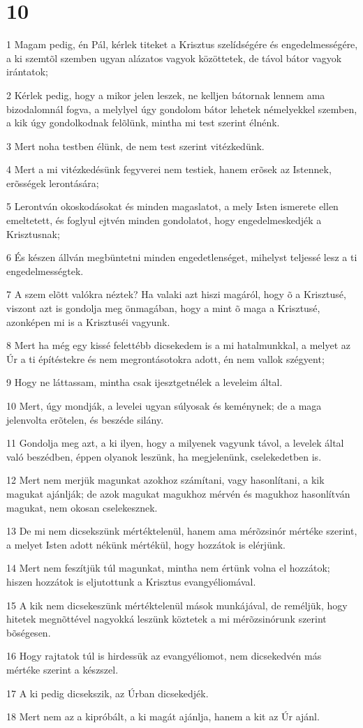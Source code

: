 \chapter{10}

\par 1 Magam pedig, én Pál, kérlek titeket a Krisztus szelídségére és engedelmességére, a ki szemtõl szemben ugyan alázatos  vagyok közöttetek, de távol bátor vagyok irántatok;
\par 2 Kérlek pedig, hogy a mikor jelen leszek, ne kelljen bátornak lennem ama bizodalomnál fogva, a melylyel úgy gondolom bátor lehetek némelyekkel szemben, a kik úgy gondolkodnak felõlünk, mintha mi test szerint élnénk.
\par 3 Mert noha testben élünk, de nem test szerint vitézkedünk.
\par 4 Mert a mi vitézkedésünk fegyverei nem testiek, hanem erõsek az Istennek, erõsségek  lerontására;
\par 5 Lerontván okoskodásokat és minden magaslatot, a mely Isten ismerete ellen emeltetett, és foglyul ejtvén minden gondolatot, hogy engedelmeskedjék a Krisztusnak;
\par 6 És készen állván megbüntetni minden engedetlenséget, mihelyst teljessé lesz a ti engedelmességtek.
\par 7 A szem elõtt valókra néztek? Ha valaki azt hiszi magáról, hogy õ a Krisztusé, viszont azt is gondolja meg önmagában, hogy a mint õ maga a Krisztusé, azonképen mi is a Krisztuséi vagyunk.
\par 8 Mert ha még egy kissé felettébb dicsekedem is a mi hatalmunkkal, a  melyet az Úr a ti építéstekre és nem megrontásotokra adott, én nem vallok szégyent;
\par 9 Hogy ne láttassam, mintha csak ijesztgetnélek a leveleim által.
\par 10 Mert, úgy mondják, a levelei ugyan súlyosak és keménynek; de a maga jelenvolta erõtelen, és beszéde silány.
\par 11 Gondolja meg azt, a ki ilyen, hogy a milyenek vagyunk távol, a levelek által való beszédben, éppen olyanok leszünk, ha megjelenünk, cselekedetben is.
\par 12 Mert nem merjük magunkat azokhoz számítani, vagy hasonlítani, a kik magukat ajánlják; de azok magukat magukhoz mérvén és magukhoz hasonlítván magukat, nem okosan cselekesznek.
\par 13 De mi nem dicsekszünk mértéktelenül, hanem ama mérõzsinór mértéke szerint, a melyet Isten adott nékünk mértékül, hogy hozzátok is elérjünk.
\par 14 Mert nem feszítjük túl magunkat, mintha nem értünk volna el hozzátok; hiszen hozzátok is eljutottunk a Krisztus evangyéliomával.
\par 15 A kik nem dicsekeszünk mértéktelenül mások munkájával, de reméljük, hogy hitetek megnõttével nagyokká leszünk köztetek a mi mérõzsinórunk szerint bõségesen.
\par 16 Hogy rajtatok túl is hirdessük az evangyéliomot, nem dicsekedvén más mértéke szerint a készszel.
\par 17 A ki pedig dicsekszik, az Úrban dicsekedjék.
\par 18 Mert nem az a kipróbált, a ki magát ajánlja, hanem a kit az  Úr ajánl.


